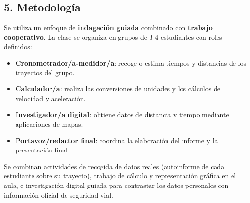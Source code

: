 \documentclass[11pt,a4paper]{article}
\begin{document}
\subsection*{5. Metodología}
Se utiliza un enfoque de \textbf{indagación guiada} combinado con \textbf{trabajo cooperativo}. La clase se organiza en grupos de 3-4 estudiantes con roles definidos:
\begin{itemize}
    \item \textbf{Cronometrador/a-medidor/a}: recoge o estima tiempos y distancias de los trayectos del grupo.
    \item \textbf{Calculador/a}: realiza las conversiones de unidades y los cálculos de velocidad y aceleración.
    \item \textbf{Investigador/a digital}: obtiene datos de distancia y tiempo mediante aplicaciones de mapas.
    \item \textbf{Portavoz/redactor final}: coordina la elaboración del informe y la presentación final.
\end{itemize}
Se combinan actividades de recogida de datos reales (autoinforme de cada estudiante sobre su trayecto), trabajo de cálculo y representación gráfica en el aula, e investigación digital guiada para contrastar los datos personales con información oficial de seguridad vial.
\end{document}
